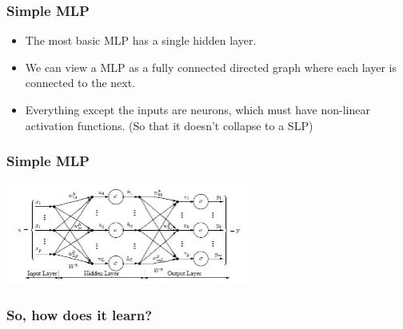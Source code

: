 \documentclass{beamer}
\begin{document}
\begin{frame}
\frametitle{Simple MLP}
\begin{itemize}
\item The most basic MLP has a single hidden layer.
\item We can view a MLP as a fully connected directed graph where each layer is connected to the next.
\item Everything except the inputs are neurons, which must have non-linear activation functions. (So that it doesn't collapse to a SLP)
\end{itemize}
\end{frame}
\begin{frame}
\frametitle{Simple MLP}

\includegraphics[width=300px]{mls.jpg}

\end{frame}

\begin{frame}	
\frametitle{So, how does it learn?}
\end{frame}
\end{document}
